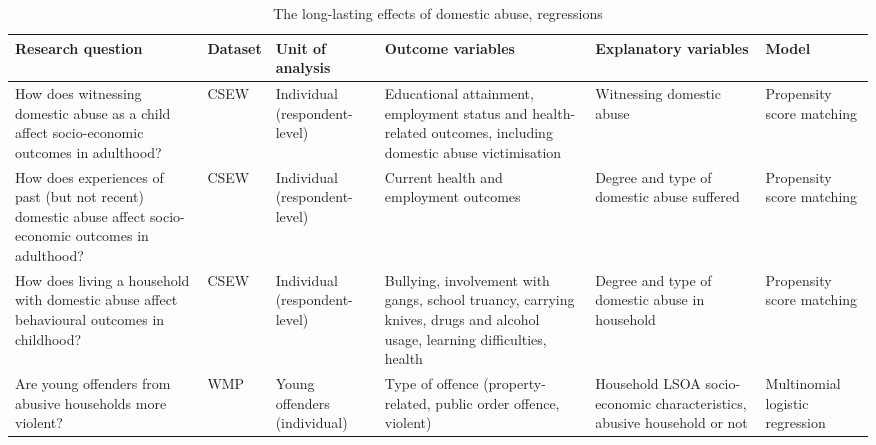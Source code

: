 \documentclass[11pt, a4paper]{article}
\begin{document}
\begin{table}[!htbp]
\caption{The long-lasting effects of domestic abuse, regressions}
  \begin{threeparttable}[t]
  \centering
       \begin{tabular}{ L{2.8cm}  C{1.8cm}  C{1.8cm}  C{3.2cm}  C{2.8cm}  C{2cm} }
    \toprule
     \textbf{Research question} & \textbf{Dataset}    & \textbf{Unit of analysis} & \textbf{Outcome variables} & \textbf{Explanatory variables} & \textbf{Model} \\
    \midrule
    How does witnessing domestic abuse as a child affect socio-economic outcomes in adulthood? & CSEW & Individual (respondent-level) & Educational attainment, employment status and health-related outcomes, including domestic abuse victimisation & Witnessing domestic abuse & Propensity score matching \\
                \midrule
                   How does experiences of past (but not recent) domestic abuse affect socio-economic outcomes in adulthood? & CSEW & Individual (respondent-level) & Current health and employment outcomes & Degree and type of domestic abuse suffered & Propensity score matching \\
                \midrule
     How does living a household with domestic abuse affect behavioural outcomes in childhood? & CSEW & Individual (respondent-level) & Bullying, involvement with gangs, school truancy, carrying knives, drugs and alcohol usage, learning difficulties, health & Degree and type of domestic abuse in household & Propensity score matching \\
                \midrule
          Are young offenders from abusive households more violent? & WMP & Young offenders (individual) & Type of offence (property-related, public order offence, violent) & Household LSOA socio-economic characteristics, abusive household or not & Multinomial logistic regression \\
     \bottomrule
  \end{tabular}
    \end{threeparttable}%
  \label{tab:addlabel}%
\end{table}%


\end{document}
